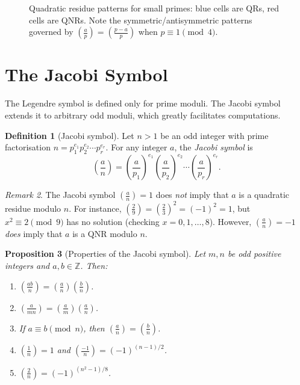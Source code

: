 \documentclass[12pt,a4paper,openany]{book}
\theoremstyle{definition}
\newtheorem{definition}{Definition}[chapter]
\theoremstyle{plain}
\newtheorem{proposition}[definition]{Proposition}
\theoremstyle{remark}
\newtheorem{remark}[definition]{Remark}
\newcommand{\Z}{\mathbb{Z}}
\newcommand{\legendre}[2]{\left(\frac{#1}{#2}\right)}
\newcommand{\jacobi}[2]{\left(\frac{#1}{#2}\right)}
\begin{document}
\begin{figure}[ht]
\caption{Quadratic residue patterns for small primes: blue cells are QRs,
  red cells are QNRs. Note the symmetric/antisymmetric patterns governed by
  $\legendre{a}{p} = \legendre{p-a}{p}$ when $p \equiv 1 \pmod{4}$.}
\label{fig:qr-pattern}
\end{figure}

\section{The Jacobi Symbol}
\label{sec:jacobi-symbol}

The Legendre symbol is defined only for prime moduli. The Jacobi symbol extends
it to arbitrary odd moduli, which greatly facilitates computations.

\begin{definition}[Jacobi symbol]
\label{def:jacobi}
Let $n > 1$ be an odd integer with prime factorisation $n = p_1^{e_1} p_2^{e_2} \cdots p_r^{e_r}$.
For any integer $a$, the \emph{Jacobi symbol} is
\[
  \jacobi{a}{n} = \legendre{a}{p_1}^{e_1} \legendre{a}{p_2}^{e_2} \cdots \legendre{a}{p_r}^{e_r}.
\]
\end{definition}

\begin{remark}
\label{rem:jacobi-warning}
The Jacobi symbol $\jacobi{a}{n} = 1$ does \emph{not} imply that $a$ is a quadratic
residue modulo $n$. For instance, $\jacobi{2}{9} = \legendre{2}{3}^2 = (-1)^2 = 1$,
but $x^2 \equiv 2 \pmod{9}$ has no solution (checking $x = 0, 1, \ldots, 8$).
However, $\jacobi{a}{n} = -1$ \emph{does} imply that $a$ is a QNR modulo $n$.
\end{remark}

\begin{proposition}[Properties of the Jacobi symbol]
\label{prop:jacobi-properties}
Let $m, n$ be odd positive integers and $a, b \in \Z$. Then:
\begin{enumerate}[label=\textup{(\roman*)}]
  \item $\jacobi{ab}{n} = \jacobi{a}{n}\jacobi{b}{n}$.
  \item $\jacobi{a}{mn} = \jacobi{a}{m}\jacobi{a}{n}$.
  \item If $a \equiv b \pmod{n}$, then $\jacobi{a}{n} = \jacobi{b}{n}$.
  \item $\jacobi{1}{n} = 1$ and $\jacobi{-1}{n} = (-1)^{(n-1)/2}$.
  \item $\jacobi{2}{n} = (-1)^{(n^2-1)/8}$.
\end{enumerate}
\end{proposition}
\end{document}
